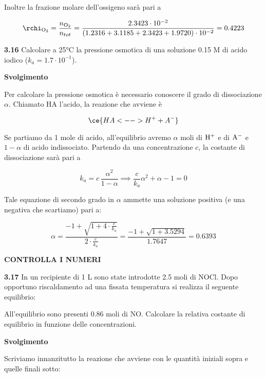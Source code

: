 Inoltre la frazione molare dell'ossigeno sarà pari a

$$\rchi_{\rm O_2}=\frac{n_{\rm O_2}}{n_{tot}}=\frac{2.3423 \cdot 10^{-2}}{(1.2316 + 3.1185 + 2.3423 + 1.9720) \cdot 10^{-2}}=0.4223$$

\vspace{0.2cm}\textbf{3.16} Calcolare a 25°C la pressione osmotica di una soluzione 0.15 M di acido iodico ($k_a=1.7 \cdot 10^{-1}$).

\vspace{0.2cm}\large\textbf{Svolgimento}\normalsize

\vspace{0.2cm}Per calcolare la pressione osmotica è necessario conoscere il grado di dissociazione $\alpha$. Chiamato HA l'acido, la reazione che avviene è

$$\ce{HA <--> H^+ + A^-}$$

Se partiamo da 1 mole di acido, all'equilibrio avremo $\alpha$ moli di $\rm H^+$ e di $\rm A^-$ e $1-\alpha$ di acido indissociato. Partendo da una concentrazione $c$, la costante di dissociazione sarà pari a

$$k_a=c\,\frac{\alpha^2}{1-\alpha}
\implies
\frac{c}{k_a}\alpha^2 + \alpha -1=0$$

Tale equazione di secondo grado in $\alpha$ ammette una soluzione positiva (e una negativa che scartiamo) pari a:

$$\alpha=\frac{-1 + \sqrt{1 + 4 \cdot \displaystyle \frac{c}{k_a}}}{2 \cdot \displaystyle \frac{c}{k_a}}
=\frac{-1 + \sqrt{1 + 3.5294}}{1.7647}=0.6393$$

\textbf{CONTROLLA I NUMERI}

\vspace{0.2cm}\textbf{3.17} In un recipiente di 1 L sono state introdotte 2.5 moli di NOCl. Dopo opportuno riscaldamento ad una fissata temperatura si realizza il seguente equilibrio:

\begin{center}
\end{center}

All'equilibrio sono presenti 0.86 moli di NO. Calcolare la relativa costante di equilibrio in funzione delle concentrazioni.

\vspace{0.2cm}\large\textbf{Svolgimento}\normalsize

\vspace{0.2cm}Scriviamo innanzitutto la reazione che avviene con le quantità iniziali sopra e quelle finali sotto: 

